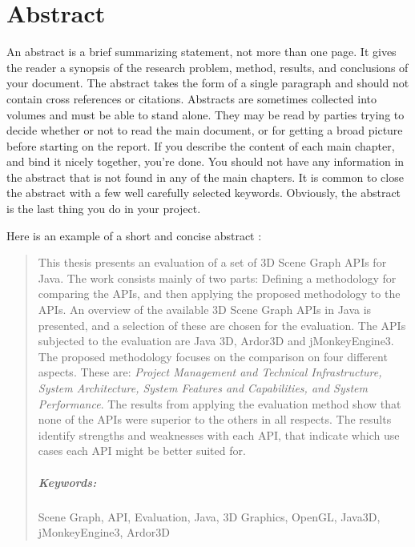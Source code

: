 
\chapter*{Abstract}
\label{chap:abstract}

An abstract is a brief summarizing statement, not more than one page. It gives the reader a synopsis of the research problem, method, results, and conclusions of your document. The abstract takes the form of a single paragraph and should not contain cross references or citations. Abstracts are sometimes collected into volumes and must be able to stand alone. They may be read by parties trying to decide whether or not to read the main document, or for getting a broad picture before starting on the report. If you describe the content of each main chapter, and bind it nicely together, you’re done. You should not have any information in the abstract that is not found in any of the main chapters. It is common to close the abstract with a few well carefully selected keywords. Obviously, the abstract is the last thing you do in your project. 

Here is an example of a short and concise abstract \cite{winger12e3s}:

\begin{quotation}
\noindent  This thesis presents an evaluation of a set of 3D Scene Graph APIs for Java. The work consists mainly of two parts: Defining a methodology for comparing the APIs, and then applying the proposed methodology to the APIs.
An overview of the available 3D Scene Graph APIs in Java is presented, and a selection of these are chosen for the evaluation. The APIs subjected to the evaluation are Java 3D, Ardor3D and jMonkeyEngine3.
The proposed methodology focuses on the comparison on four different aspects. These are: \textit{Project Management and Technical Infrastructure, System Architecture, System Features and Capabilities, and System Performance}.
The results from applying the evaluation method show that none of the APIs were superior to the others in all respects. The results identify strengths and weaknesses with each API, that indicate which use cases each API might be better suited for.
\newline 
\paragraph{Keywords:} Scene Graph, API, Evaluation, Java, 3D Graphics, OpenGL, Java3D, jMonkeyEngine3, Ardor3D
\end{quotation}


